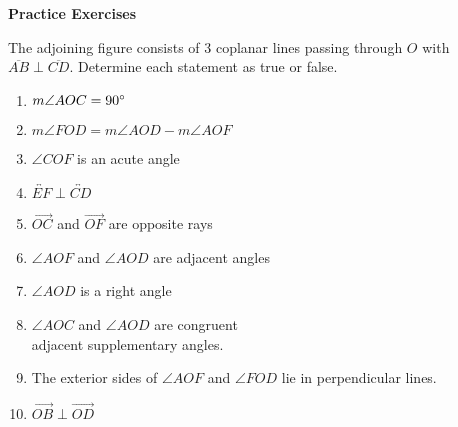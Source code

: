 \textbf{Practice Exercises}

\vspce

The adjoining figure consists of 3 coplanar lines passing through $O$ with $\overline{AB} \perp \overline{CD}$. Determine each statement as true or false.

{\begin{enumerate}[label = \arabic*. ]
\item	$m\angle{AOC}=90\degree$ 
\item	$m\angle{FOD}= m\angle{AOD} - m\angle{AOF}$ 
\item	$\angle{COF}$ is an acute angle
\item	$\overleftrightarrow{EF} \perp \overleftrightarrow{CD}$ 
\item	$\overrightarrow{OC}$ and $\overrightarrow{OF}$ are opposite rays 
\item	$\angle{AOF}$ and $\angle{AOD}$ are adjacent angles
\item	$\angle{AOD}$ is a right angle
\item	$\angle{AOC}$ and $\angle{AOD}$ are congruent\\ adjacent supplementary angles.
\item	The exterior sides of $\angle{AOF}$ and $\angle{FOD}$ lie in perpendicular lines.
\item	$\overrightarrow{OB} \perp \overrightarrow{OD} $
\end{enumerate}}

\vspace*{-14.5em}\hspace*{18em} 
\vspace*{2em}


     





